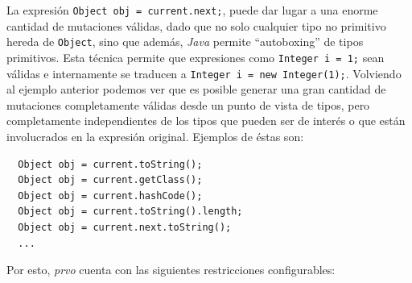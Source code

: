 La expresi\'on \lstinline|Object obj = current.next;|, puede dar lugar a una enorme cantidad de mutaciones v\'alidas, dado que no solo cualquier tipo no primitivo hereda de \texttt{Object}, sino que adem\'as, \emph{Java} permite ``autoboxing'' de tipos primitivos. Esta t\'ecnica permite que expresiones como \lstinline|Integer i = 1;| sean v\'alidas e internamente se traducen a \lstinline|Integer i = new Integer(1);|. Volviendo al ejemplo anterior podemos ver que es posible generar una gran cantidad de mutaciones completamente v\'alidas desde un punto de vista de tipos, pero completamente independientes de los tipos que pueden ser de inter\'es o que est\'an involucrados en la expresi\'on original. Ejemplos de \'estas son:
\begin{lstlisting}
  Object obj = current.toString();
  Object obj = current.getClass();
  Object obj = current.hashCode();
  Object obj = current.toString().length;
  Object obj = current.next.toString();
  ...
\end{lstlisting}

Por esto, \emph{prvo} cuenta con las siguientes restricciones configurables:

